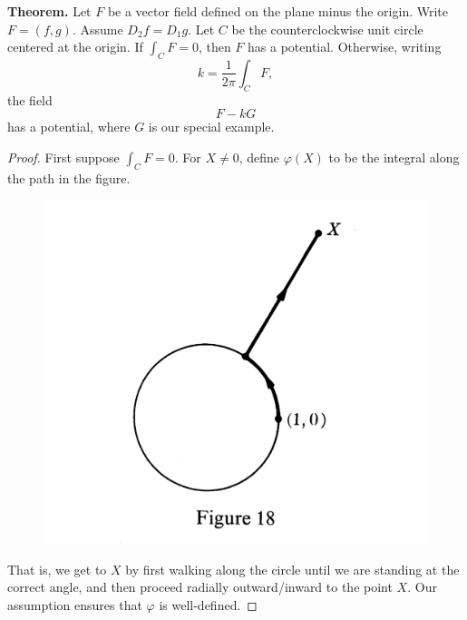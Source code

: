 \documentclass{article}
\begin{document}
\textbf{Theorem.} Let $F$ be a vector field defined on the plane minus the origin.
Write $F = (f,g)$. Assume $D_2 f = D_1 g$. Let $C$ be the counterclockwise unit circle
centered at the origin. If $\int_C F = 0$, then $F$ has a potential. Otherwise,
writing \[k = \frac{1}{2\pi} \int_C F,\]
the field \[F - kG\] has a potential, where $G$ is our special example.
\begin{proof}
    First suppose $\int_C F = 0$. For $X \neq 0$, define $\varphi(X)$ to be 
    the integral along the path in the figure.
    \begin{figure}[h]
        \centering
        \includegraphics[scale = 0.15]{contour.jpeg}
    \end{figure}
    That is, we get to $X$ by first walking along the circle until we 
    are standing at the correct angle, and then proceed radially outward/inward to the point $X$.
    Our assumption ensures that $\varphi$ is well-defined. 
\end{proof}
\end{document}
